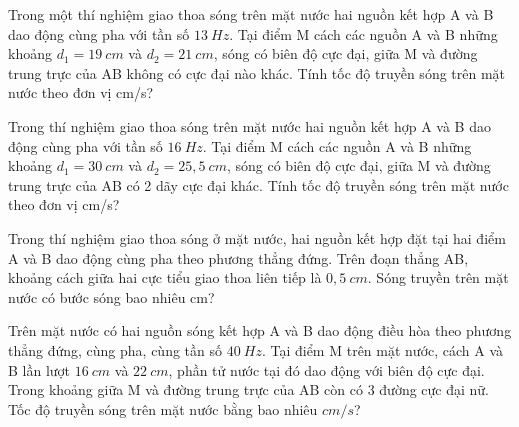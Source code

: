 \begin{ex}
Trong một thí nghiệm giao thoa sóng trên mặt nước hai nguồn kết hợp A và B dao động cùng pha với tần số $13 \ Hz$. Tại điểm M cách các nguồn A và B những khoảng $d_1=19 \ cm$ và $d_2=21 \ cm$, sóng có biên độ cực đại, giữa M và đường trung trực của AB không có cực đại nào khác. Tính tốc độ truyền sóng trên mặt nước theo đơn vị cm/s?
\end{ex} 
\begin{ex}
Trong thí nghiệm giao thoa sóng trên mặt nước hai nguồn kết hợp A và B dao động cùng pha với tần số $16 \ Hz$. Tại điểm M cách các nguồn A và B những khoảng $d_1=30 \ cm$ và $d_2=25,5 \ cm$, sóng có biên độ cực đại, giữa M và đường trung trực của AB có 2 dãy cực đại khác. Tính tốc độ truyền sóng trên mặt nước theo đơn vị cm/s?
\end{ex} 
\begin{ex}
Trong thí nghiệm giao thoa sóng ở mặt nước, hai nguồn kết hợp đặt tại hai điểm A và B dao động cùng pha theo phương thẳng đứng. Trên đoạn thẳng AB, khoảng cách giữa hai cực tiểu giao thoa liên tiếp là $0,5 \ cm$. Sóng truyền trên mặt nước có bước sóng bao nhiêu cm?
\end{ex} 
\begin{ex}
Trên mặt nước có hai nguồn sóng kết hợp A và B dao động điều hòa theo phương thẳng đứng, cùng pha, cùng tần số $40 \ Hz$. Tại điểm M trên mặt nước, cách A và B lần lượt $16 \ cm$ và $22 \ cm$, phần tử nước tại đó dao động với biên độ cực đại. Trong khoảng giữa M và đường trung trực của AB còn có 3 đường cực đại nữ. Tốc độ truyền sóng trên mặt nước bằng bao nhiêu $cm/s$?
\end{ex} 
